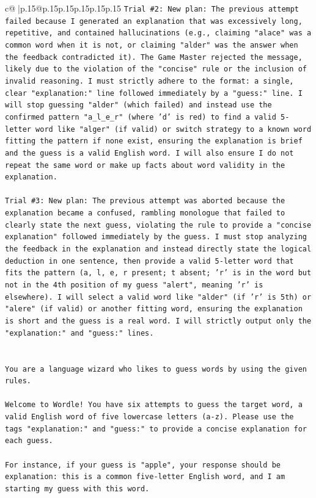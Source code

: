 \documentclass{article}
\begin{document}
{\begin{supertabular}{c@{$\;$}|p{.15\linewidth}@{}p{.15\linewidth}p{.15\linewidth}p{.15\linewidth}p{.15\linewidth}p{.15\linewidth}}
{{{\texttt{Trial \#2: New plan: The previous attempt failed because I generated an explanation that was excessively long, repetitive, and contained hallucinations (e.g., claiming "alace" was a common word when it is not, or claiming "alder" was the answer when the feedback contradicted it). The Game Master rejected the message, likely due to the violation of the "concise" rule or the inclusion of invalid reasoning. I must strictly adhere to the format: a single, clear "explanation:" line followed immediately by a "guess:" line. I will stop guessing "alder" (which failed) and instead use the confirmed pattern "a\_l\_e\_r" (where 'd' is red) to find a valid 5{-}letter word like "alger" (if valid) or switch strategy to a known word fitting the pattern if none exist, ensuring the explanation is brief and the guess is a valid English word. I will also ensure I do not repeat the same word or make up facts about word validity in the explanation.} \\
\\ 
\texttt{Trial \#3: New plan: The previous attempt was aborted because the explanation became a confused, rambling monologue that failed to clearly state the next guess, violating the rule to provide a "concise explanation" followed immediately by the guess. I must stop analyzing the feedback in the explanation and instead directly state the logical deduction in one sentence, then provide a valid 5{-}letter word that fits the pattern (a, l, e, r present; t absent; 'r' is in the word but not in the 4th position of my guess "alert", meaning 'r' is elsewhere). I will select a valid word like "alder" (if 'r' is 5th) or "alere" (if valid) or another fitting word, ensuring the explanation is short and the guess is a real word. I will strictly output only the "explanation:" and "guess:" lines.} \\
\\ 
\\ 
\texttt{You are a language wizard who likes to guess words by using the given rules.} \\
\\ 
\texttt{Welcome to Wordle! You have six attempts to guess the target word, a valid English word of five lowercase letters (a{-}z). Please use the tags "explanation:" and "guess:" to provide a concise explanation for each guess.} \\
\\ 
\texttt{For instance, if your guess is "apple", your response should be} \\
\texttt{explanation: this is a common five{-}letter English word, and I am starting my guess with this word.} \\
}}}
\end{supertabular}}
\end{document}

